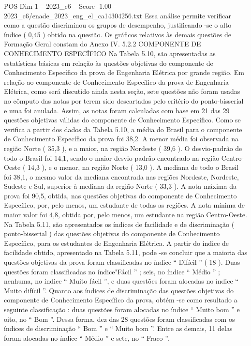 \begin{textsample}{POS Dim 1 – 2023\_c6 – Score -1.00 – 2023\_c6/enade\_2023\_eng\_el\_ca14304256.txt}
Essa análise permite verificar como a questão discriminou os grupos de desempenho, justificando -se o alto índice ( 0,45 ) obtido na questão.
Os gráficos relativos às demais questões de Formação Geral constam do Anexo IV. 5.2.2 COMPONENTE DE CONHECIMENTO ESPECÍFICO Na Tabela 5.10, são apresentadas as estatísticas básicas em relação às questões objetivas do componente de Conhecimento Específico da prova de Engenharia Elétrica por grande região.
Em relação ao componente de Conhecimento Específico da prova de Engenharia Elétrica, como será discutido ainda nesta seção, sete questões não foram usadas no cômputo das notas por terem sido descartadas pelo critério do ponto-bisserial e uma foi anulada.
Assim, as notas foram calculadas com base em 21 das 29 questões objetivas válidas do componente de Conhecimento Específico.
Como se verifica a partir dos dados da Tabela 5.10, a média do Brasil para o componente de Conhecimento Específico da prova foi 38,2.
A menor média foi observada na região Norte ( 35,3 ), e a maior, na região Nordeste ( 39,6 ).
O desvio-padrão de todo o Brasil foi 14,1, sendo o maior desvio-padrão encontrado na região Centro-Oeste ( 14,3 ), e o menor, na região Norte ( 13,0 ).
A mediana de todo o Brasil foi 38,1, o mesmo valor da mediana encontrada nas regiões Nordeste, Nordeste, Sudeste e Sul, superior à mediana da região Norte ( 33,3 ).
A nota máxima da prova foi 90,5, obtida, nas questões objetivas do componente de Conhecimento Específico, por, pelo menos, um estudante de todas as regiões.
A nota mínima de maior valor foi 4,8, obtida por, pelo menos, um estudante na região Centro-Oeste.
Na Tabela 5.11, são apresentados os índices de facilidade e de discriminação ( ponto-bisserial ) das questões objetivas do componente de Conhecimento Específico, para os estudantes de Engenharia Elétrica.
A partir do índice de facilidade obtido, apresentado na Tabela 5.11, pode -se concluir que a maioria das questões objetivas da prova foram classificadas no índice “ Difícil ” ( 18 ).
Duas questões foram classificadas no índice"Fácil ” ; seis, no índice “ Médio ” ; nenhuma, no índice “ Muito fácil ”, e duas questões foram alocadas no índice “ Muito difícil ”.
Quanto aos índices de discriminação das questões objetivas do componente de Conhecimento Específico da prova, obtém -se como resultado a seguinte classificação : duas questões foram alocadas no índice “ Muito bom ” e oito, no “ Bom ”.
Dessa forma, dez das 28 questões foram classificadas com os índices de discriminação “ Bom ” e “ Muito bom ”.
Entre as demais, 11 delas foram alocadas no índice “ Médio ” e sete, no “ Fraco ”.

\end{textsample}
